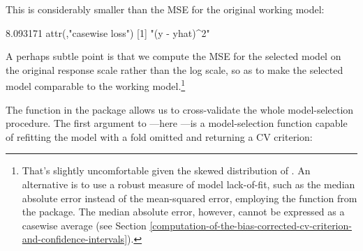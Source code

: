 \documentclass[
]{jss}
\begin{document}
This is considerably smaller than the MSE for the original working
model:

\begin{CodeChunk}
\begin{CodeOutput}
[1] 8.093171
attr(,"casewise loss")
[1] "(y - yhat)^2"
\end{CodeOutput}
\end{CodeChunk}

A perhaps subtle point is that we compute the MSE for the selected model
on the original  response scale rather than the log scale, so
as to make the selected model comparable to the working
model.\footnote{That's slightly uncomfortable given the skewed
  distribution of . An alternative is to use a robust measure
  of model lack-of-fit, such as the median absolute error instead of the
  mean-squared error, employing the  function from the
   package. The median absolute error, however, cannot be
  expressed as a casewise average (see Section
  \ref{computation-of-the-bias-corrected-cv-criterion-and-confidence-intervals}).}

The  function in the  package allows us to
cross-validate the whole model-selection procedure. The first argument
to ---here ---is a
model-selection function capable of refitting the model with a fold
omitted and returning a CV criterion:
\end{document}
